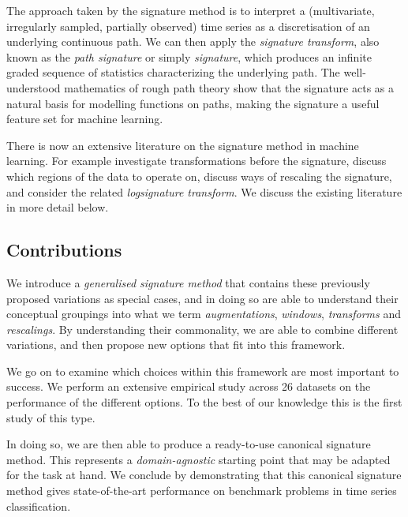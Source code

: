 \documentclass{article}
\theoremstyle{definition}
\theoremstyle{remark}
\begin{document}
	The approach taken by the signature method is to interpret a (multivariate, irregularly sampled, partially observed) time series as a discretisation of an underlying continuous path. We can then apply the \emph{signature transform}, also known as the \emph{path signature} or simply \emph{signature}, which produces an infinite graded sequence of statistics characterizing the underlying path. The well-understood mathematics of rough path theory \citep{levy-lyons, FritzVictoir10} show that the signature acts as a natural basis for modelling functions on paths, making the signature a useful feature set for machine learning.
	
	
	There is now an extensive literature on the signature method in machine learning. For example \citet{kiraly2016kernels, kidger2019deep,fermanian2019embedding} investigate transformations before the signature, \citet{yang2017leveraging} discuss which regions of the data to operate on, \citet{primer2016,normsig} discuss ways of rescaling the signature, and \citet{li2017lpsnet, logsig-rnn} consider the related \emph{logsignature transform}. We discuss the existing literature in more detail below.
	
	\subsection{Contributions}
	We introduce a \emph{generalised signature method} that contains these previously proposed variations as special cases, and in doing so are able to understand their conceptual groupings into what we term \emph{augmentations}, \emph{windows}, \emph{transforms} and \emph{rescalings}. By understanding their commonality, we are able to combine different variations, and then propose new options that fit into this framework.

	We go on to examine which choices within this framework are most important to success. We perform an extensive empirical study across 26 datasets on the performance of the different options. To the best of our knowledge this is the first study of this type.
	
	In doing so, we are then able to produce a ready-to-use canonical signature method. This represents a \emph{domain-agnostic} starting point that may be adapted for the task at hand. We conclude by demonstrating that this canonical signature method gives state-of-the-art performance on benchmark problems in time series classification.
\end{document}
